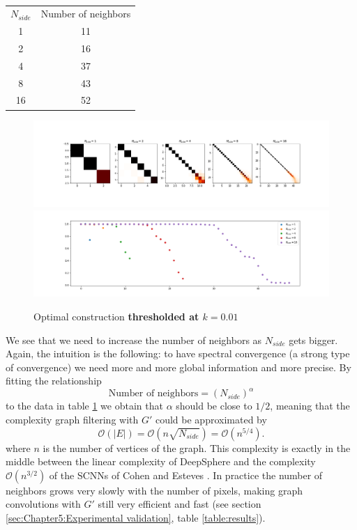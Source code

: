 \begin{table}[h]
	\centering
	\begin{tabular}{ c|c} 
		$N_{side}$ & Number of neighbors \\ 
		1 & 11 \\ 
		2 & 16 \\ 
		4 & 37 \\ 
		8 & 43 \\ 
		16 & 52 \\ 
	\end{tabular}
\caption{\label{table:NN}}
\end{table}

\begin{figure}[h]
	\centering
	\includegraphics[width=\textwidth]{../codes/02.HeatKernelGraphLaplacian/HEALPix/06_figures/optimal_thresholded.png}	
	\includegraphics[width=\textwidth]{../codes/02.HeatKernelGraphLaplacian/HEALPix/06_figures/optimal_thresholded_diagonal.png}
	\caption{\label{fig:optimal_thresholded}Optimal construction \textbf{thresholded at $k=0.01$}}
\end{figure}

We see that we need to increase the number of neighbors as $N_{side}$ gets bigger. Again, the intuition is the following: to have spectral convergence (a strong type of convergence) we need more and more global information and more precise. By fitting the relationship
$$
\text{Number of neighbors} = (N_{side})^\alpha
$$
to the data in table \ref{table:NN} we obtain that $\alpha$ should be close to $1/2$, meaning that the complexity graph filtering with $G'$ could be approximated by
$$
\mathcal O(|E|) = \mathcal O(n\sqrt{N_{side}})  = \mathcal{O}(n^{5/4}).
$$
where $n$ is the number of vertices of the graph. This complexity is exactly in the middle between the linear complexity of DeepSphere and the complexity $\mathcal O(n^{3/2})$ of the SCNNs of Cohen and Esteves \cite{SCNN} \cite{Esteves}. In practice the number of neighbors grows very slowly with the number of pixels, making graph convolutions with $G'$ still very efficient and fast (see section \ref{sec:Chapter5:Experimental validation}, table \ref{table:results}). 

